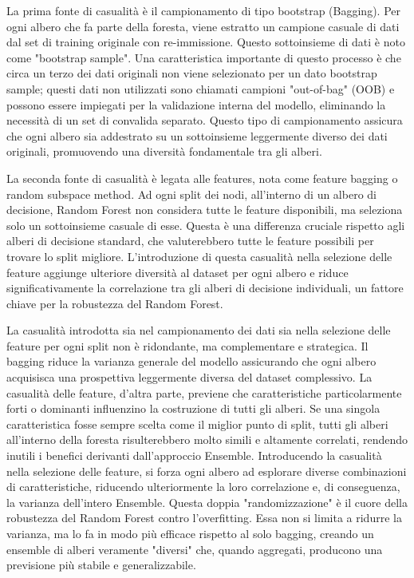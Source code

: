 \documentclass[a4paper,12pt]{report}
\begin{document}
	La prima fonte di casualità è il campionamento di tipo bootstrap (Bagging). Per ogni albero che fa parte della foresta, viene estratto un campione casuale di dati dal set di training originale con re-immissione. Questo sottoinsieme di dati è noto come "bootstrap sample". Una caratteristica importante di questo processo è che circa un terzo dei dati originali non viene selezionato per un dato bootstrap sample; questi dati non utilizzati sono chiamati campioni "out-of-bag" (OOB) e possono essere impiegati per la validazione interna del modello, eliminando la necessità di un set di convalida separato. Questo tipo di campionamento assicura che ogni albero sia addestrato su un sottoinsieme leggermente diverso dei dati originali, promuovendo una diversità fondamentale tra gli alberi.
	
	La seconda fonte di casualità è legata alle features, nota come feature bagging o random subspace method. Ad ogni split dei nodi, all'interno di un albero di decisione, Random Forest non considera tutte le feature disponibili, ma seleziona solo un sottoinsieme casuale di esse. Questa è una differenza cruciale rispetto agli alberi di decisione standard, che valuterebbero tutte le feature possibili per trovare lo split migliore. L'introduzione di questa casualità nella selezione delle feature aggiunge ulteriore diversità al dataset per ogni albero e riduce significativamente la correlazione tra gli alberi di decisione individuali, un fattore chiave per la robustezza del Random Forest.
	
	La casualità introdotta sia nel campionamento dei dati sia nella selezione delle feature per ogni split non è ridondante, ma complementare e strategica. Il bagging riduce la varianza generale del modello assicurando che ogni albero acquisisca una prospettiva leggermente diversa del dataset complessivo. La casualità delle feature, d'altra parte, previene che caratteristiche particolarmente forti o dominanti influenzino la costruzione di tutti gli alberi. Se una singola caratteristica fosse sempre scelta come il miglior punto di split, tutti gli alberi all'interno della foresta risulterebbero molto simili e altamente correlati, rendendo inutili i benefici derivanti dall'approccio Ensemble. Introducendo la casualità nella selezione delle feature, si forza ogni albero ad esplorare diverse combinazioni di caratteristiche, riducendo ulteriormente la loro correlazione e, di conseguenza, la varianza dell'intero Ensemble. Questa doppia "randomizzazione" è il cuore della robustezza del Random Forest contro l'overfitting. Essa non si limita a ridurre la varianza, ma lo fa in modo più efficace rispetto al solo bagging, creando un ensemble di alberi veramente "diversi" che, quando aggregati, producono una previsione più stabile e generalizzabile.
	
\end{document}
